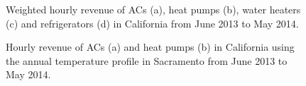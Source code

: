 \documentclass[onecolumn,journal]{IEEEtran}
\begin{document}
\begin{figure}[tb]
\centering
{}
\caption{Weighted hourly revenue of ACs (a), heat pumps (b), water heaters (c) and refrigerators (d) in California from June 2013 to May 2014. }\label{fig:yearly_revenue}
\end{figure}

\begin{figure}[tb]
\centering
{}
\caption{Hourly revenue of ACs (a) and heat pumps (b) in California using the annual temperature profile in Sacramento from June 2013 to May 2014. }\label{fig:yearly_revenue}
\end{figure}
\end{document}
